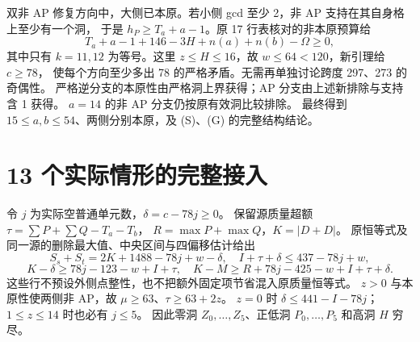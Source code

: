\documentclass[11pt,a4paper]{article}
\begin{document}
双非 AP 修复方向中，大侧已本原。若小侧 gcd 至少 2，非 AP 支持在其自身格上至少有一个洞，
于是 $h_P\ge T_a+a-1$。原 17 行表核对的非本原预算给
\[
T_a+a-1+146-3H+n(a)+n(b)-\Omega\ge0,
\]
其中只有 $k=11,12$ 为等号。这里 $z\le H\le16$，故 $w\le64<120$，新引理给 $c\ge78$，
使每个方向至少多出 78 的严格矛盾。无需再单独讨论跨度 297、273 的奇偶性。
严格逆分支的本原性由严格洞上界获得；AP 分支由上述新排除与支持含 1 获得。
$a=14$ 的非 AP 分支仍按原有效洞比较排除。
最终得到 $15\le a,b\le54$、两侧分别本原，及 (S)、(G) 的完整结构结论。

\section{13 个实际情形的完整接入}\label{strata}
令 $j$ 为实际空普通单元数，$\delta=c-78j\ge0$。
保留源质量超额 $\tau=\sum P+\sum Q-T_a-T_b$，
$R=\max P+\max Q$，$K=|D+D|$。
原恒等式及同一源的删除最大值、中央区间与四偏移估计给出
\[
S_s+S_t=2K+1488-78j+w-\delta,
\quad I+\tau+\delta\le437-78j+w,
\]
\[
K-\delta\ge78j-123-w+I+\tau,\quad
K-M\ge R+78j-425-w+I+\tau+\delta.
\]
这些行不预设外侧点整性，也不把额外固定项节省混入原质量恒等式。
$z>0$ 与本原性使两侧非 AP，故 $\mu\ge63$、$\tau\ge63+2z$。
$z=0$ 时 $\delta\le441-I-78j$；$1\le z\le14$ 时也必有 $j\le5$。
因此零洞 $Z_0,\ldots,Z_5$、正低洞 $P_0,\ldots,P_5$ 和高洞 $H$ 穷尽。
\end{document}
